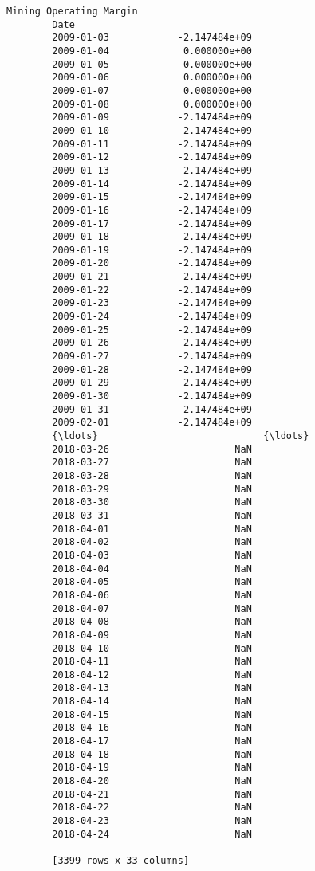 \documentclass[11pt]{article}
\begin{document}
\begin{Verbatim}[commandchars=\\\{\}]
                    Mining Operating Margin  
        Date                                 
        2009-01-03            -2.147484e+09  
        2009-01-04             0.000000e+00  
        2009-01-05             0.000000e+00  
        2009-01-06             0.000000e+00  
        2009-01-07             0.000000e+00  
        2009-01-08             0.000000e+00  
        2009-01-09            -2.147484e+09  
        2009-01-10            -2.147484e+09  
        2009-01-11            -2.147484e+09  
        2009-01-12            -2.147484e+09  
        2009-01-13            -2.147484e+09  
        2009-01-14            -2.147484e+09  
        2009-01-15            -2.147484e+09  
        2009-01-16            -2.147484e+09  
        2009-01-17            -2.147484e+09  
        2009-01-18            -2.147484e+09  
        2009-01-19            -2.147484e+09  
        2009-01-20            -2.147484e+09  
        2009-01-21            -2.147484e+09  
        2009-01-22            -2.147484e+09  
        2009-01-23            -2.147484e+09  
        2009-01-24            -2.147484e+09  
        2009-01-25            -2.147484e+09  
        2009-01-26            -2.147484e+09  
        2009-01-27            -2.147484e+09  
        2009-01-28            -2.147484e+09  
        2009-01-29            -2.147484e+09  
        2009-01-30            -2.147484e+09  
        2009-01-31            -2.147484e+09  
        2009-02-01            -2.147484e+09  
        {\ldots}                             {\ldots}  
        2018-03-26                      NaN  
        2018-03-27                      NaN  
        2018-03-28                      NaN  
        2018-03-29                      NaN  
        2018-03-30                      NaN  
        2018-03-31                      NaN  
        2018-04-01                      NaN  
        2018-04-02                      NaN  
        2018-04-03                      NaN  
        2018-04-04                      NaN  
        2018-04-05                      NaN  
        2018-04-06                      NaN  
        2018-04-07                      NaN  
        2018-04-08                      NaN  
        2018-04-09                      NaN  
        2018-04-10                      NaN  
        2018-04-11                      NaN  
        2018-04-12                      NaN  
        2018-04-13                      NaN  
        2018-04-14                      NaN  
        2018-04-15                      NaN  
        2018-04-16                      NaN  
        2018-04-17                      NaN  
        2018-04-18                      NaN  
        2018-04-19                      NaN  
        2018-04-20                      NaN  
        2018-04-21                      NaN  
        2018-04-22                      NaN  
        2018-04-23                      NaN  
        2018-04-24                      NaN  
        
        [3399 rows x 33 columns]
\end{Verbatim}
            

    
    
    
    
\end{document}
